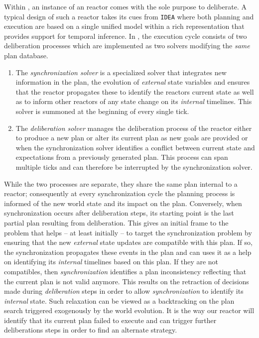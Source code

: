Within \rx, an instance of an \eu reactor comes with the sole purpose
to deliberate. A typical design of such a reactor takes its cues from
\texttt{IDEA} \cite{mus02, mus06} where both planning and execution
are based on a single unified model within a rich representation that
provides support for temporal inference. In \rx, the execution cycle
consists of two deliberation processes which are implemented as two
\eu solvers modifying the \emph{same} plan database. %

\begin{enumerate}

\item The \emph{synchronization solver} is a specialized \eu solver
  that integrates new information in the plan, the evolution of
  \emph{external} state variables and ensures that the reactor
  propagates these to identify the reactors current state as well as
  to inform other reactors of any state change on its \emph{internal}
  timelines. This solver is summoned at the beginning of every single
  tick.

\item The \emph{deliberation solver} manages the deliberation process
  of the reactor either to produce a new plan or alter its current
  plan as new goals are provided or when the synchronization solver
  identifies a conflict between current state and expectations from a
  previously generated plan. This process can span multiple ticks and
  can therefore be interrupted by the synchronization solver.

\end{enumerate}

While the two processes are separate, they share the same plan
internal to a reactor; consequently at every synchronization cycle the
planning process is informed of the new world state and its impact on
the plan. Conversely, when synchronization occurs after deliberation
steps, its starting point is the last partial plan resulting from
deliberation. This gives an initial frame to the problem that helps
-- at least initially -- to target the synchronization problem by
ensuring that the new {\em external} state updates are compatible with
this plan. If so, the synchronization propagates these events in the
plan and can uses it as a help on identifying its {\em internal}
timelines based on this plan. If they are not compatibles, then
{\em synchronization} identifies a plan inconsistency  reflecting that the
current plan is not valid anymore. This results on the retraction of
decisions made during {\em deliberation} steps in order to allow 
{\em synchronization} to identify its {\em internal}  state. Such
relaxation can be viewed as a backtracking on the plan search
triggered exogenously by the world evolution. It is the way our
reactor will identify that its current plan failed to execute and can
trigger further deliberations steps in order to find an alternate 
strategy.

